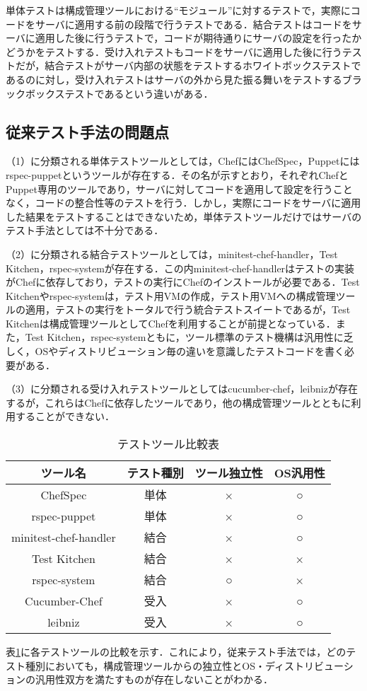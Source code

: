単体テストは構成管理ツールにおける``モジュール''に対するテストで，実際にコードをサーバに適用する前の段階で行うテストである．結合テストはコードをサーバに適用した後に行うテストで，コードが期待通りにサーバの設定を行ったかどうかをテストする．受け入れテストもコードをサーバに適用した後に行うテストだが，結合テストがサーバ内部の状態をテストするホワイトボックステストであるのに対し，受け入れテストはサーバの外から見た振る舞いをテストするブラックボックステストであるという違いがある．

\subsection{従来テスト手法の問題点}

（1）に分類される単体テストツールとしては，ChefにはChefSpec，Puppetにはrspec-puppetというツールが存在する．その名が示すとおり，それぞれChefとPuppet専用のツールであり，サーバに対してコードを適用して設定を行うことなく，コードの整合性等のテストを行う．しかし，実際にコードをサーバに適用した結果をテストすることはできないため，単体テストツールだけではサーバのテスト手法としては不十分である．

（2）に分類される結合テストツールとしては，minitest-chef-handler，Test Kitchen，rspec-systemが存在する．この内minitest-chef-handlerはテストの実装がChefに依存しており，テストの実行にChefのインストールが必要である．Test Kitchenやrspec-systemは，テスト用VMの作成，テスト用VMへの構成管理ツールの適用，テストの実行をトータルで行う統合テストスイートであるが，Test Kitchenは構成管理ツールとしてChefを利用することが前提となっている．また，Test Kitchen，rspec-systemともに，ツール標準のテスト機構は汎用性に乏しく，OSやディストリビューション毎の違いを意識したテストコードを書く必要がある．

（3）に分類される受け入れテストツールとしてはcucumber-chef，leibnizが存在するが，これらはChefに依存したツールであり，他の構成管理ツールとともに利用することができない．

\begin{table}[htb]
  \begin{center}
    \caption{テストツール比較表\label{tab:comparison}}
    \begin{tabular}{c|ccc}
      \hline
      \hline
      ツール名 & テスト種別 & ツール独立性 & OS汎用性 \\
      \hline
      ChefSpec              & 単体 & ×  & ○ \\
      \hline
      rspec-puppet          & 単体 & ×  & ○ \\
      \hline
      minitest-chef-handler & 結合 & ×  & ○ \\
      \hline
      Test Kitchen          & 結合 & ×  & × \\
      \hline
      rspec-system          & 結合 & ○ & × \\
      \hline
      Cucumber-Chef         & 受入 & ×  & ○ \\
      \hline
      leibniz               & 受入 & ×  & ○ \\
      \hline
    \end{tabular}
  \end{center}
\end{table}

表\ref{tab:comparison}に各テストツールの比較を示す．これにより，従来テスト手法では，どのテスト種別においても，構成管理ツールからの独立性とOS・ディストリビューションの汎用性双方を満たすものが存在しないことがわかる．
